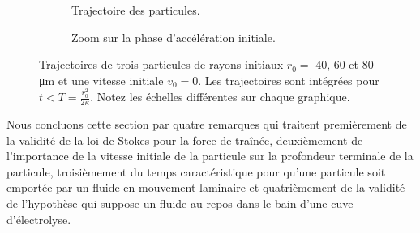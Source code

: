 \begin{figure}
 \begin{center}
    \begin{subfigure}[b]{0.49\textwidth}
      
      \caption{Trajectoire des particules.}
      \label{fig:particle-trajectories-a}
    \end{subfigure}
    \begin{subfigure}[b]{0.49\textwidth}
      
      \caption{Zoom sur la phase d'accélération initiale.}
      \label{fig:particle-trajectories-b}
    \end{subfigure}

    \caption{Trajectoires de trois particules de rayons initiaux $r_0 =
      $ 40, 60 et 80 \si{\micro\meter} et une vitesse initiale $v_0 =
      0$. Les trajectoires sont intégrées pour $t < T =
      \frac{r_0^2}{2\kappa}$. Notez les échelles différentes sur
      chaque graphique.}
    \label{fig:particle-trajectories}
  \end{center}
\end{figure}

Nous concluons cette section par quatre remarques qui traitent
premièrement de la validité de la loi de Stokes pour la force de traînée,
deuxièmement de l'importance de la vitesse initiale de la particule
sur la profondeur terminale de la particule, troisièmement du temps
caractéristique pour qu'une particule soit emportée par un fluide en
mouvement laminaire et quatrièmement de la validité de l'hypothèse qui
suppose un fluide au repos dans le bain d'une cuve d'électrolyse.



